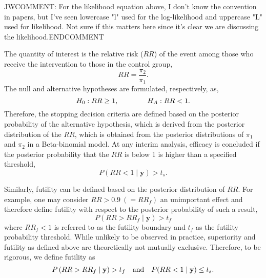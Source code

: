 \documentclass[12pt]{article}
\begin{document}
JWCOMMENT:  For the likelihood equation above, I don't know the convention in papers, but  I've seen lowercase "l" used for the log-likelihood and uppercase "L" used for likelihood.  Not sure if this matters here since it's clear we are discussing the likelihood.ENDCOMMENT

The quantity of interest is the relative risk ($RR$) of the event among those who receive the intervention to those in the control group, 
\begin{equation*}
RR = \frac{\pi_2}{\pi_1}.
\end{equation*}
The null and alternative hypotheses are formulated, respectively, as,
\begin{equation*}
H_0: RR \geq 1, \hskip 40pt H_A: RR <1.
\end{equation*}
Therefore, the stopping decision criteria are defined based on the posterior probability of the alternative hypothesis, which is derived from the posterior distribution of the $RR$, which is obtained from the posterior distributions of $\pi_1$ and $\pi_2$ in a Beta-binomial model. At any interim analysis, efficacy is concluded if the posterior probability that the $RR$ is below 1 is higher than a specified threshold,
\begin{equation}
P\left(RR < 1 \mid \mathbf{y} \right)>t_s.
\end{equation}

Similarly, futility can be defined based on the posterior distribution of $RR$. For example, one may consider  $RR>0.9\ (=RR_f)$ an unimportant effect and therefore define futility with respect to the posterior probability of such a  result,
\begin{equation}
P\left(RR >RR_f\mid \mathbf{y} \right)>t_f
\end{equation}
where $RR_f<1$ is referred to as the futility boundary and $t_f$ as the futility probability threshold. While unlikely to be observed in practice, superiority and futility as defined above are theoretically not mutually exclusive. Therefore, to be rigorous, we define futility as 
\begin{equation}
\label{fut}
P\left(RR >RR_f\mid \mathbf{y} \right)>t_f \hskip 10pt \text{and} \hskip 10pt P(RR<1\mid \mathbf{y})\leq t_s.
\end{equation}
\end{document}
